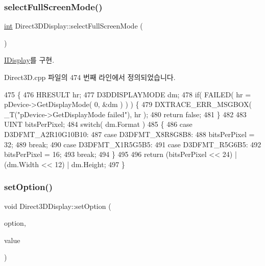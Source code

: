\subsubsection{\texorpdfstring{select\+Full\+Screen\+Mode()}{selectFullScreenMode()}}
{\footnotesize\ttfamily \mbox{\hyperlink{_util_8cpp_a0ef32aa8672df19503a49fab2d0c8071}{int}} Direct3\+D\+Display\+::select\+Full\+Screen\+Mode (\begin{DoxyParamCaption}\item[{G\+U\+ID $\ast$$\ast$}]{ }\end{DoxyParamCaption})\hspace{0.3cm}{\ttfamily [virtual]}}



\mbox{\hyperlink{class_i_display_a2f7a55f63c5e4b24245aa88228afab68}{I\+Display}}를 구현.



Direct3\+D.\+cpp 파일의 474 번째 라인에서 정의되었습니다.


\begin{DoxyCode}
475 \{
476     HRESULT hr;
477     D3DDISPLAYMODE dm;
478     \textcolor{keywordflow}{if}( FAILED( hr = pDevice->GetDisplayMode( 0, &dm ) ) ) \{
479         DXTRACE\_ERR\_MSGBOX( \_T(\textcolor{stringliteral}{"pDevice->GetDisplayMode failed"}), hr );
480         \textcolor{keywordflow}{return} \textcolor{keyword}{false};
481     \}
482 
483     UINT bitsPerPixel;
484     \textcolor{keywordflow}{switch}( dm.Format )
485     \{
486     \textcolor{keywordflow}{case} D3DFMT\_A2R10G10B10:
487     \textcolor{keywordflow}{case} D3DFMT\_X8R8G8B8:
488         bitsPerPixel = 32;
489         \textcolor{keywordflow}{break};
490     \textcolor{keywordflow}{case} D3DFMT\_X1R5G5B5:
491     \textcolor{keywordflow}{case} D3DFMT\_R5G6B5:
492         bitsPerPixel = 16;
493         \textcolor{keywordflow}{break};
494     \}
495 
496     \textcolor{keywordflow}{return} (bitsPerPixel << 24) | (dm.Width << 12) | dm.Height;
497 \}
\end{DoxyCode}
\mbox{\label{class_direct3_d_display_a9fb19225514b70c7178aa871c9852936}} 
\subsubsection{\texorpdfstring{set\+Option()}{setOption()}}
{\footnotesize\ttfamily void Direct3\+D\+Display\+::set\+Option (\begin{DoxyParamCaption}\item[{\mbox{\hyperlink{getopt1_8c_a2c212835823e3c54a8ab6d95c652660e}{const}} char $\ast$}]{option,  }\item[{\mbox{\hyperlink{_util_8cpp_a0ef32aa8672df19503a49fab2d0c8071}{int}}}]{value }\end{DoxyParamCaption})\hspace{0.3cm}{\ttfamily [virtual]}}



